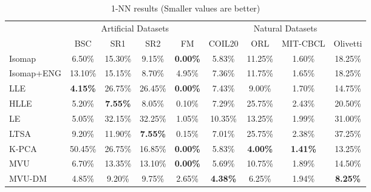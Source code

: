 \documentclass{article} %
\begin{document}
\begin{table}[t]
\caption{1-NN results (Smaller values are better)}
\label{tab:1NN}
\begin{center}
\begin{tabular}{l|c|c|c|c||c|c|c|c}
\hline
\multicolumn{1}{c|}{} & \multicolumn{4}{c||}{Artificial Datasets} & \multicolumn{4}{c}{Natural Datasets} \\
                     & BSC & SR1 & SR2 & FM & COIL20 & ORL & MIT-CBCL & Olivetti \\
\hline
Isomap            & 6.50\% & 15.30\% & 9.15\% & \textbf{0.00\%} & 5.83\% & 11.25\% & 1.60\% & 18.25\% \\
Isomap+ENG            & 13.10\% & 15.15\% & 8.70\% & 4.95\% & 7.36\% & 11.75\% & 1.65\% & 18.25\% \\
LLE            & \textbf{4.15\%} & 26.75\% & 26.45\% & \textbf{0.00\%} & 7.43\% & 9.00\% & 1.70\% & 14.75\% \\
HLLE            & 5.20\% & \textbf{7.55\%} & 8.05\% & 0.10\% & 7.29\% & 25.75\% & 2.43\% & 20.50\% \\
LE            & 5.05\% & 32.15\% & 32.25\% & 1.05\% & 10.35\% & 13.25\% & 1.99\% & 31.00\% \\
LTSA            & 9.20\% & 11.90\% & \textbf{7.55\%} & 0.15\% & 7.01\% & 25.75\% & 2.38\% & 37.25\% \\
K-PCA            & 50.45\% & 26.75\% & 16.85\% & \textbf{0.00\%} & 5.83\% & \textbf{4.00\%} & \textbf{1.41\%} & 13.25\% \\
\hline
MVU            & 6.70\% & 13.35\% & 13.10\% & \textbf{0.00\%} & 5.69\% & 10.75\% & 1.89\% & 14.50\% \\
MVU-DM            & 4.85\% & 9.20\% & 9.75\% & 2.65\% & \textbf{4.38\%} & 6.25\% & 1.94\% & \textbf{8.25\%} \\
\hline
\end{tabular}
\end{center}
\end{table}
\end{document}
